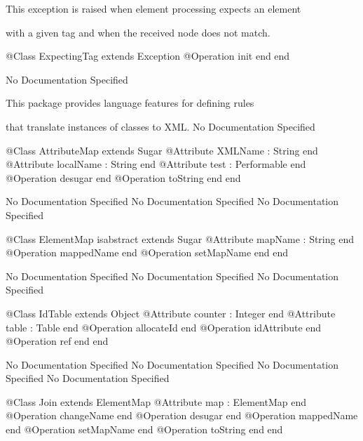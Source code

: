       This exception is raised when element processing expects an element

      with a given tag and when the received node does not match.
\begin{Interface}
@Class ExpectingTag extends Exception
  @Operation init end
end
\end{Interface}
No Documentation Specified

      This package provides language features for defining rules

      that translate instances of classes to XML.
No Documentation Specified
\begin{Interface}
@Class AttributeMap extends Sugar
  @Attribute XMLName : String end
  @Attribute localName : String end
  @Attribute test : Performable end
  @Operation desugar end
  @Operation toString end
end
\end{Interface}
No Documentation Specified
No Documentation Specified
No Documentation Specified
\begin{Interface}
@Class ElementMap isabstract extends Sugar
  @Attribute mapName : String end
  @Operation mappedName end
  @Operation setMapName end
end
\end{Interface}
No Documentation Specified
No Documentation Specified
No Documentation Specified
\begin{Interface}
@Class IdTable extends Object
  @Attribute counter : Integer end
  @Attribute table : Table end
  @Operation allocateId end
  @Operation idAttribute end
  @Operation ref end
end
\end{Interface}
No Documentation Specified
No Documentation Specified
No Documentation Specified
No Documentation Specified
\begin{Interface}
@Class Join extends ElementMap
  @Attribute map : ElementMap end
  @Operation changeName end
  @Operation desugar end
  @Operation mappedName end
  @Operation setMapName end
  @Operation toString end
end
\end{Interface}
